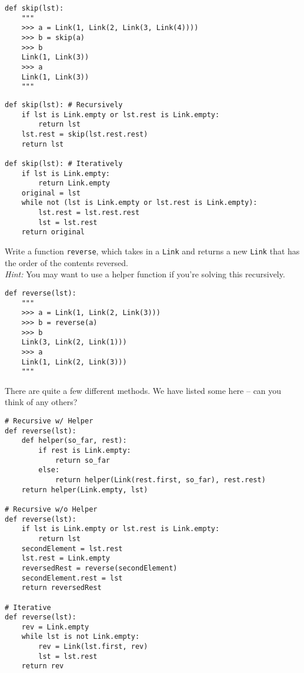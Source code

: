 \documentclass{exam}
\begin{document}
\begin{questions}
\begin{blocksection}
\begin{lstlisting}
def skip(lst):
    """
    >>> a = Link(1, Link(2, Link(3, Link(4))))
    >>> b = skip(a)
    >>> b
    Link(1, Link(3))
    >>> a
    Link(1, Link(3))
    """
\end{lstlisting}

\begin{solution}[1in]
\begin{lstlisting}
def skip(lst): # Recursively
    if lst is Link.empty or lst.rest is Link.empty:
        return lst
    lst.rest = skip(lst.rest.rest)
    return lst

def skip(lst): # Iteratively
    if lst is Link.empty:
        return Link.empty
    original = lst
    while not (lst is Link.empty or lst.rest is Link.empty):
        lst.rest = lst.rest.rest
        lst = lst.rest
    return original
\end{lstlisting}
\end{solution}

\end{blocksection}

\begin{blocksection}
\question Write a function \texttt{reverse}, which takes in a \texttt{Link} and
returns a new \texttt{Link} that has the order of the contents reversed.\\
\emph{Hint:} You may want to use a helper function if you're solving this
recursively.
\begin{lstlisting}
def reverse(lst):
    """
    >>> a = Link(1, Link(2, Link(3)))
    >>> b = reverse(a)
    >>> b
    Link(3, Link(2, Link(1)))
    >>> a
    Link(1, Link(2, Link(3)))
    """
\end{lstlisting}

\begin{solution}[1in]
There are quite a few different methods. We have listed some here -- can you
think of any others?
\begin{lstlisting}
# Recursive w/ Helper
def reverse(lst):
    def helper(so_far, rest):
        if rest is Link.empty:
            return so_far
        else:
            return helper(Link(rest.first, so_far), rest.rest)
    return helper(Link.empty, lst)

# Recursive w/o Helper
def reverse(lst):
    if lst is Link.empty or lst.rest is Link.empty:
        return lst
    secondElement = lst.rest
    lst.rest = Link.empty
    reversedRest = reverse(secondElement)
    secondElement.rest = lst
    return reversedRest

# Iterative
def reverse(lst):
    rev = Link.empty
    while lst is not Link.empty:
        rev = Link(lst.first, rev)
        lst = lst.rest
    return rev
\end{lstlisting}
\end{solution}


\end{blocksection}
\end{questions}
\end{document}
